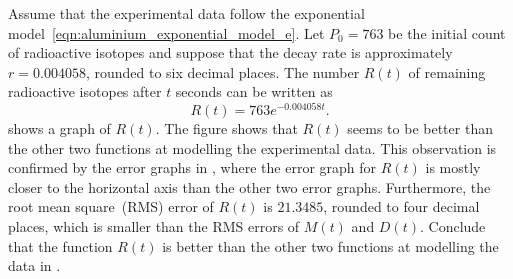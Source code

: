 \documentclass[a4paper,oneside,12pt]{article}
\begin{document}
\begin{problem}
{\begin{solution}
Assume that the experimental data follow the exponential
model~\eqref{eqn:aluminium_exponential_model_e}.  Let $P_0 = 763$ be
the initial count of radioactive isotopes and suppose that the decay
rate is approximately $r = 0.004058$, rounded to six decimal places.
The number $R(t)$ of remaining radioactive isotopes after $t$ seconds
can be written as
\begin{equation}
\label{eqn:aluminium_mean_decay_rate}
R(t)
=
763 e^{-0.004058 t}.
\end{equation}
 shows a graph of $R(t)$.  The
figure shows that $R(t)$ seems to be better than the other two
functions at modelling the experimental data.  This observation is
confirmed by the error graphs in
, where the error graph for
$R(t)$ is mostly closer to the horizontal axis than the other two
error graphs.  Furthermore, the root mean square~(RMS) error of $R(t)$
is $21.3485$, rounded to four decimal places, which is smaller than
the RMS errors of $M(t)$ and $D(t)$.  Conclude that the function
$R(t)$ is better than the other two functions at modelling the data in
.
\end{solution}
}{}

\begin{table}[!htbp]
\centering

\caption{%
  The vapour pressure of water as temperature increases.  Temperature
  is measured in degrees Celsius~($\degreec{}$) and the vapour
  pressure of water is measured in millimetre of mercury~(mm Hg).  The
  given vapour pressures cover only the case where water is in contact
  with its own vapour.  Data are taken from the following book:
  J.~G.~Speight~(editor). \emph{Lange's Handbook of Chemistry}. 16-th
  edition, McGraw-Hill, 2005, pp.1.224--1.225.
}
\label{tab:water_vapour_pressure}
\end{table}


\end{problem}
\end{document}

